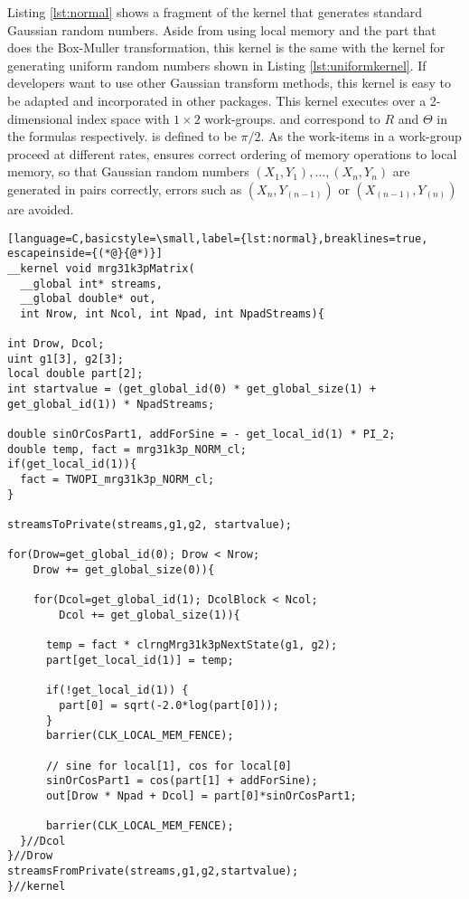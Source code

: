 \documentclass[article,nojss]{jss}\usepackage[]{graphicx}\usepackage[]{color}
\begin{document}
Listing \ref{lst:normal} shows a fragment of the kernel that generates standard Gaussian random numbers. Aside from using local memory and the part that does the Box-Muller transformation, this kernel is the same with the kernel for generating uniform random numbers shown in Listing \ref{lst:uniformkernel}. If developers want to use other Gaussian transform methods, this kernel is easy to be adapted and incorporated in other  packages. This kernel executes over a 2-dimensional index space with $1 \times 2$ work-groups.  and  correspond to $R$ and $\Theta$ in the formulas respectively.  is defined to be $\pi/2$. As the work-items in a work-group proceed at different rates,  ensures correct ordering of memory operations to local memory, so that Gaussian random numbers $(X_1,Y_1), \dots, (X_n,Y_n)$ are generated in pairs correctly, errors such as $(X_n, Y_{(n-1)})$ or $(X_{(n-1)}, Y_{(n)})$ are avoided.
%

\begin{lstlisting}[language=C,basicstyle=\small,label={lst:normal},breaklines=true, escapeinside={(*@}{@*)}]
__kernel void mrg31k3pMatrix(
  __global int* streams,
  __global double* out,
  int Nrow, int Ncol, int Npad, int NpadStreams){

int Drow, Dcol;
uint g1[3], g2[3];
local double part[2];
int startvalue = (get_global_id(0) * get_global_size(1) + 
get_global_id(1)) * NpadStreams;

double sinOrCosPart1, addForSine = - get_local_id(1) * PI_2;
double temp, fact = mrg31k3p_NORM_cl;
if(get_local_id(1)){
  fact = TWOPI_mrg31k3p_NORM_cl;
}

streamsToPrivate(streams,g1,g2, startvalue);

for(Drow=get_global_id(0); Drow < Nrow;
    Drow += get_global_size(0)){

    for(Dcol=get_global_id(1); DcolBlock < Ncol; 
        Dcol += get_global_size(1)){
        
      temp = fact * clrngMrg31k3pNextState(g1, g2);
      part[get_local_id(1)] = temp;
      
      if(!get_local_id(1)) {
        part[0] = sqrt(-2.0*log(part[0]));
      }
      barrier(CLK_LOCAL_MEM_FENCE);
      
      // sine for local[1], cos for local[0]
      sinOrCosPart1 = cos(part[1] + addForSine);
      out[Drow * Npad + Dcol] = part[0]*sinOrCosPart1;

      barrier(CLK_LOCAL_MEM_FENCE);
  }//Dcol
}//Drow
streamsFromPrivate(streams,g1,g2,startvalue);
}//kernel
\end{lstlisting}
\end{document}
